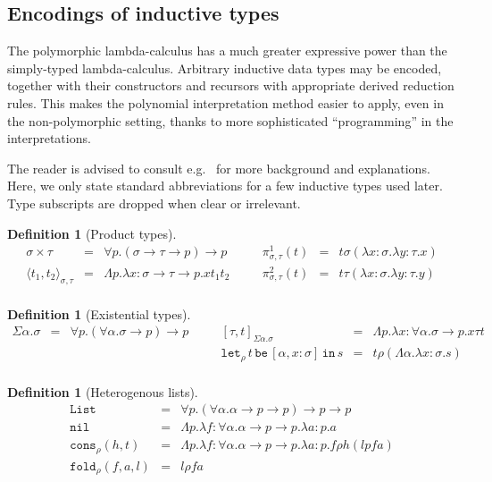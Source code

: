 \documentclass[a4paper,UKenglish,cleveref,autoref,numberwithinsect]{lipics-v2019}
\theoremstyle{definition}
\newtheorem{defn}[theorem]{Definition}
\newcommand{\arrtype}{\rightarrow}
\newcommand{\abs}[2]{\lambda #1.#2}
\newcommand{\tabs}[2]{\Lambda #1.#2}
\newcommand{\pair}[2]{\langle #1,#2 \rangle}
\newcommand{\expair}[2]{[#1,#2]}
\newcommand{\List}{\mathtt{List}}
\newcommand{\nil}{\mathtt{nil}}
\newcommand{\cons}{\mathtt{cons}}
\newcommand{\fold}{\mathtt{fold}}
\newcommand{\xlet}[4]{\mathtt{let}_{#1}\,#2\,\mathtt{be}\,[#3]\,\mathtt{in}\,#4}
\begin{document}
\subsection{Encodings of inductive types}\label{sec_encodings}

The polymorphic lambda-calculus has a much greater expressive power
than the simply-typed lambda-calculus. Arbitrary inductive data types
may be encoded, together with their constructors and recursors with
appropriate derived reduction rules. This makes the polynomial
interpretation method easier to apply, even in the non-polymorphic
setting, thanks to more sophisticated ``programming'' in the
interpretations.

The reader is advised to consult e.g.~\cite[Chapter~11]{Girard1989}
for more background and explanations. Here, we only state standard
abbreviations for a few inductive types used later. Type subscripts
are dropped when clear or irrelevant.

\begin{defn}[Product types]
  \[
  \begin{array}{rclcrcl}
    \sigma \times \tau &=& \forall p . (\sigma \arrtype \tau \arrtype p) \arrtype p & \quad &
    \pi^1_{\sigma,\tau}(t) &=& t \sigma (\abs{x:\sigma}{\abs{y:\tau}{x}}) \\
    \pair{t_1}{t_2}_{\sigma,\tau} &=& \tabs{p}{\abs{x:\sigma\arrtype\tau\arrtype p}{x t_1 t_2}} & &
    \pi^2_{\sigma,\tau}(t) &=& t \tau (\abs{x:\sigma}{\abs{y:\tau}{y}}) \\
  \end{array}
  \]
\end{defn}

\begin{defn}[Existential types]
  \[
  \begin{array}{rclcrcl}
    \Sigma \alpha . \sigma &=& \forall p . (\forall \alpha . \sigma \arrtype p) \arrtype p & \quad &
    \expair{\tau}{t}_{\Sigma\alpha.\sigma} &=& \tabs{p}{\abs{x:\forall\alpha.\sigma\arrtype p}{x \tau t}} \\
    & & & &
    \xlet{\rho}{t}{\alpha,x:\sigma}{s} &=& t \rho (\tabs{\alpha}{\abs{x:\sigma}{s}}) \\
  \end{array}
  \]
\end{defn}

\begin{defn}[Heterogenous lists]
  \[
  \begin{array}{rcl}
    \List &=& \forall p . (\forall \alpha . \alpha \arrtype p \arrtype p) \arrtype p \arrtype p \\
    \nil &=& \tabs{p}{\abs{f:\forall \alpha . \alpha \arrtype p \arrtype p}{\abs{a : p}{a}}} \\
    \cons_\rho(h,t) &=& \tabs{p}{\abs{f:\forall\alpha . \alpha \arrtype p \arrtype p}{\abs{a : p}{f \rho h (l p f a)}}} \\
    \fold_\rho(f,a,l) &=& l \rho f a
  \end{array}
  \]
\end{defn}
\end{document}
